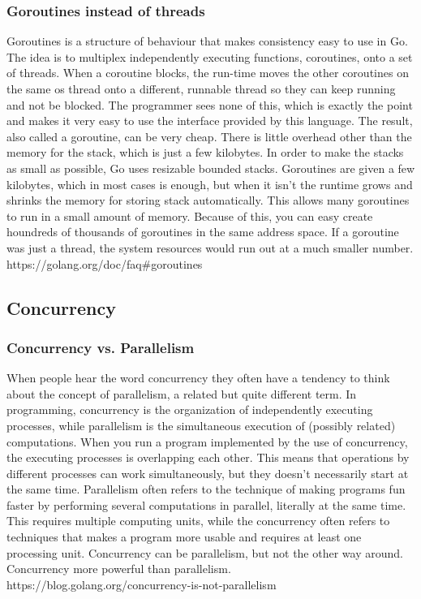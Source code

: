 \documentclass[12pt, a4paper, oneside]{article}
\begin{document}
\subsubsection{Goroutines instead of threads}
Goroutines is a structure of behaviour that makes consistency easy to use in Go. The idea is to multiplex independently executing functions, coroutines, onto a set of threads. When a coroutine blocks, the run-time moves the other coroutines on the same os thread onto a different, runnable thread so they can keep running and not be blocked. The programmer sees none of this, which is exactly the point and makes it very easy to use the interface provided by this language. 
The result, also called a goroutine, can be very cheap. There is little overhead other than the memory for the stack, which is just a few kilobytes.
In order to make the stacks as small as possible, Go uses resizable bounded stacks. Goroutines are given a few kilobytes, which in most cases is enough, but when it isn’t  the runtime grows and shrinks the memory for storing stack automatically. This allows many goroutines to run in a small amount of memory. 
Because of this, you can easy create houndreds of thousands of goroutines in the same address space. If a goroutine was just a thread, the system resources would run out at a much smaller number.
\newline
https://golang.org/doc/faq\#goroutines

\subsection{Concurrency}
\subsubsection{Concurrency vs. Parallelism}
When people hear the word concurrency they often have a tendency to think about the concept of parallelism, a related but quite different term. In programming, concurrency is the organization of independently executing processes, while parallelism is the simultaneous execution of (possibly related) computations. 
When you run a program implemented by the use of concurrency, the executing processes is overlapping each other. This means that operations by different processes can work simultaneously, but they doesn't necessarily start at the same time. 
Parallelism often refers to the technique of making programs fun faster by performing several computations in parallel, literally at the same time. This requires multiple computing units, while the concurrency often refers to techniques that makes a program more usable and requires at least one processing unit. 
Concurrency can be parallelism, but not the other way around.
Concurrency more powerful than parallelism.
\newline
https://blog.golang.org/concurrency-is-not-parallelism
\end{document}
